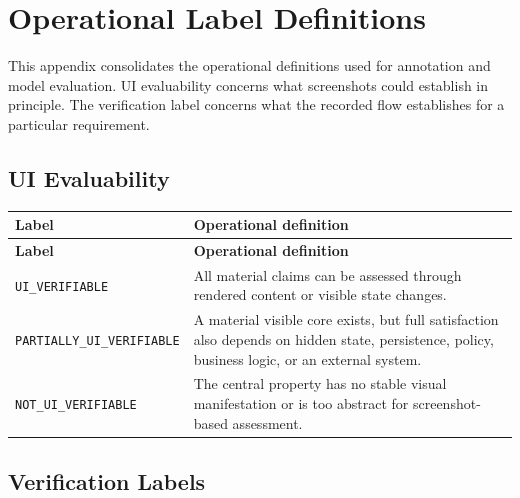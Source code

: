 \chapter{Operational Label Definitions}\label{appendix-label-definitions}

This appendix consolidates the operational definitions used for annotation and
model evaluation. UI evaluability concerns what screenshots could establish in
principle. The verification label concerns what the recorded flow establishes
for a particular requirement.

\section{UI Evaluability}

\vspace{0.5\baselineskip}

\begin{longtable}{@{}>{\raggedright\arraybackslash}p{}>{\raggedright\arraybackslash}p{}@{}}
  \toprule
  \textbf{Label} & \textbf{Operational definition} \\
  \midrule
  \endfirsthead
  \toprule
  \textbf{Label} & \textbf{Operational definition} \\
  \midrule
  \endhead
  \texttt{UI\_VERIFIABLE} & All material claims can be assessed through rendered content or visible state changes. \\
  \texttt{PARTIALLY\_\allowbreak UI\_\allowbreak VERIFIABLE} & A material visible core exists, but full satisfaction also depends on hidden state, persistence, policy, business logic, or an external system. \\
  \texttt{NOT\_UI\_\allowbreak VERIFIABLE} & The central property has no stable visual manifestation or is too abstract for screenshot-based assessment. \\
  \bottomrule
\end{longtable}

\section{Verification Labels}

\vspace{0.5\baselineskip}

